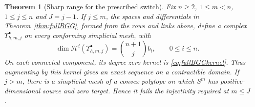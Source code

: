 \documentclass[10pt]{amsart}
\numberwithin{equation}{section}
\newtheorem{theorem}{Theorem}[section]
\begin{document}
\begin{theorem}[Sharp range for the prescribed switch]\label{thm:lowerBGG}
Fix $n\geq2$, $1\leq m<n$, $1\leq j\leq n$ and $J=j-1$.
If $j\leq m$, the spaces and differentials in Theorem~\ref{thm:fullBGG},
formed from the rows and links above, define a complex
$\Upsilon_{h,m,j}^\bullet$ on every conforming simplicial mesh, with
\begin{equation}\label{eq:lowerBGGcohomology}
\dim \mathscr H^i(\Upsilon_{h,m,j}^\bullet)=\binom{n+1}{j}b_i,
\qquad 0\leq i\leq n.
\end{equation}
On each connected component, its degree-zero kernel is
\eqref{eq:fullBGGkernel}. Thus augmenting by this kernel gives an exact
sequence on a contractible domain.
If $j>m$, there is a simplicial mesh of a convex polytope on which
$S^m$ has positive-dimensional source and zero target. Hence it fails
the injectivity required at $m\leq J$.
\end{theorem}
\end{document}
